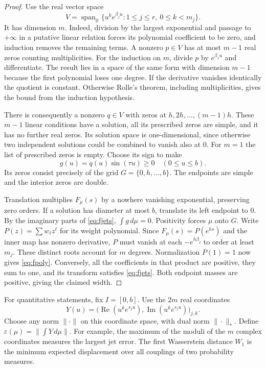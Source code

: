 \documentclass[11pt,letterpaper]{article}
\theoremstyle{remark}\newtheorem{remark}[theorem]{Remark}
\begin{document}
\begin{proof}
Use the real vector space
\[
 V=\operatorname{span}_{\mathbb R}\{u^k e^{\beta_j u}:1\le j\le r,\ 0\le k<m_j\}.
\]
It has dimension $m$. Indeed, division by the largest exponential and passage to $+\infty$ in a putative linear relation forces its polynomial coefficient to be zero, and induction removes the remaining terms. A nonzero $p\in V$ has at most $m-1$ real zeros counting multiplicities. For the induction on $m$, divide $p$ by $e^{\beta_1 u}$ and differentiate. The result lies in a space of the same form with dimension $m-1$ because the first polynomial loses one degree. If the derivative vanishes identically the quotient is constant. Otherwise Rolle's theorem, including multiplicities, gives the bound from the induction hypothesis.

There is consequently a nonzero $q\in V$ with zeros at $h,2h,\ldots,(m-1)h$. These $m-1$ linear conditions have a solution, all its prescribed zeros are simple, and it has no further real zeros. Its solution space is one-dimensional, since otherwise two independent solutions could be combined to vanish also at $0$. For $m=1$ the list of prescribed zeros is empty. Choose its sign to make
\begin{equation}\label{eq:fexposer}
 g(u)=q(u)\sin(\tau u)\ge0\quad(0\le u\le b).
\end{equation}
Its zeros consist precisely of the grid $G=\{0,h,\ldots,b\}$. The endpoints are simple and the interior zeros are double.

Translation multiplies $F_\mu(s)$ by a nowhere vanishing exponential, preserving zero orders. If a solution has diameter at most $b$, translate its left endpoint to $0$. By the imaginary parts of \eqref{eq:fjets}, $\int g\,d\mu=0$. Positivity forces $\mu$ onto $G$. Write $P(z)=\sum w_\ell z^\ell$ for its weight polynomial. Since $F_\mu(s)=P(e^{hs})$ and the inner map has nonzero derivative, $P$ must vanish at each $-e^{h\beta_j}$ to order at least $m_j$. These distinct roots account for $m$ degrees. Normalization $P(1)=1$ now gives \eqref{eq:fpoly}. Conversely, all the coefficients in that product are positive, they sum to one, and its transform satisfies \eqref{eq:fjets}. Both endpoint masses are positive, giving the claimed width.
\end{proof}

For quantitative statements, fix $I=[0,b]$. Use the $2m$ real coordinates
\[
 Y(u)=\big(\operatorname{Re}(u^k e^{s_ju}),\operatorname{Im}(u^k e^{s_ju})\big)_{j,k}.
\]
Choose any norm $\|\cdot\|$ on this coordinate space, with dual norm $\|\cdot\|_*$. Define $\varepsilon(\mu)=\|\int Y\,d\mu\|$. For example, the maximum of the moduli of the $m$ complex coordinates measures the largest jet error. The first Wasserstein distance $W_1$ is the minimum expected displacement over all couplings of two probability measures.
\end{document}
